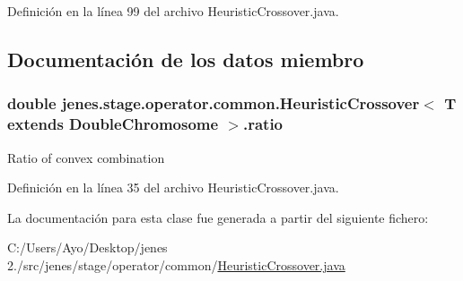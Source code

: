 Definición en la línea 99 del archivo Heuristic\-Crossover.\-java.



\subsection{Documentación de los datos miembro}
\hypertarget{classjenes_1_1stage_1_1operator_1_1common_1_1_heuristic_crossover_3_01_t_01extends_01_double_chromosome_01_4_a9cae7cf20e3154743a4dbe53054f513b}{
\subsubsection[{ratio}]{\setlength{\rightskip}{0pt plus 5cm}double jenes.\-stage.\-operator.\-common.\-Heuristic\-Crossover$<$ T extends {\bf Double\-Chromosome} $>$.ratio\hspace{0.3cm}{\ttfamily [protected]}}}\label{classjenes_1_1stage_1_1operator_1_1common_1_1_heuristic_crossover_3_01_t_01extends_01_double_chromosome_01_4_a9cae7cf20e3154743a4dbe53054f513b}
Ratio of convex combination 

Definición en la línea 35 del archivo Heuristic\-Crossover.\-java.



La documentación para esta clase fue generada a partir del siguiente fichero\-:\begin{DoxyCompactItemize}
\item 
C\-:/\-Users/\-Ayo/\-Desktop/jenes 2./src/jenes/stage/operator/common/\hyperlink{_heuristic_crossover_8java}{Heuristic\-Crossover.\-java}\end{DoxyCompactItemize}
